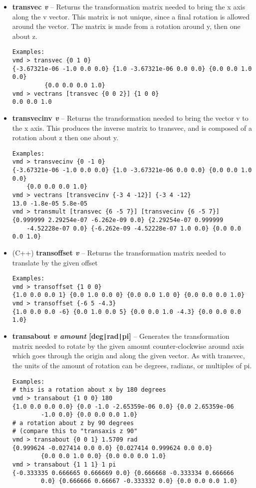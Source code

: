 \begin{itemize}
\item {\bf transvec {\it v}} --
Returns the transformation matrix needed to bring the x axis along the
v vector.  This matrix is not unique, since a final rotation is
allowed around the vector.  The matrix is made from a rotation around
y, then one about z.
\begin{verbatim}
Examples:
vmd > transvec {0 1 0}
{-3.67321e-06 -1.0 0.0 0.0} {1.0 -3.67321e-06 0.0 0.0} {0.0 0.0 1.0 0.0}
         {0.0 0.0 0.0 1.0}
vmd > vectrans [transvec {0 0 2}] {1 0 0}
0.0 0.0 1.0
\end{verbatim}

\item {\bf transvecinv {\it v}} --
Returns the transformation needed to bring the vector v to the x axis.
This produces the inverse matrix to transvec, and is composed of a
rotation about z then one about y.
\begin{verbatim}
Examples:
vmd > transvecinv {0 -1 0}
{-3.67321e-06 -1.0 0.0 0.0} {1.0 -3.67321e-06 0.0 0.0} {0.0 0.0 1.0 0.0}
    {0.0 0.0 0.0 1.0}
vmd > vectrans [transvecinv {-3 4 -12}] {-3 4 -12}
13.0 -1.8e-05 5.8e-05
vmd > transmult [transvec {6 -5 7}] [transvecinv {6 -5 7}]
{0.999999 2.29254e-07 -6.262e-09 0.0} {2.29254e-07 0.999999
    -4.52228e-07 0.0} {-6.262e-09 -4.52228e-07 1.0 0.0} {0.0 0.0 0.0 1.0}
\end{verbatim}

\item (C++) {\bf transoffset {\it v}} --
Returns the transformation matrix needed to translate by the given offset
\begin{verbatim}
Examples:
vmd > transoffset {1 0 0}
{1.0 0.0 0.0 1} {0.0 1.0 0.0 0} {0.0 0.0 1.0 0} {0.0 0.0 0.0 1.0}
vmd > transoffset {-6 5 -4.3}
{1.0 0.0 0.0 -6} {0.0 1.0 0.0 5} {0.0 0.0 1.0 -4.3} {0.0 0.0 0.0 1.0}
\end{verbatim}

\item {\bf transabout {\it v amount} [deg\verb!|!rad\verb!|!pi]} --
Generates the transformation matrix needed to rotate by the given amount
counter-clockwise around axis which goes through the origin and along the
given vector.  As with transvec, the units of the amount of rotation
can be degrees, radians, or multiples of pi.
\begin{verbatim}
Examples:
# this is a rotation about x by 180 degrees
vmd > transabout {1 0 0} 180
{1.0 0.0 0.0 0.0} {0.0 -1.0 -2.65359e-06 0.0} {0.0 2.65359e-06
        -1.0 0.0} {0.0 0.0 0.0 1.0}
# a rotation about z by 90 degrees
# (compare this to "transaxis z 90"
vmd > transabout {0 0 1} 1.5709 rad
{0.999624 -0.027414 0.0 0.0} {0.027414 0.999624 0.0 0.0} 
        {0.0 0.0 1.0 0.0} {0.0 0.0 0.0 1.0}
vmd > transabout {1 1 1} 1 pi
{-0.333335 0.666665 0.666669 0.0} {0.666668 -0.333334 0.666666
        0.0} {0.666666 0.66667 -0.333332 0.0} {0.0 0.0 0.0 1.0}
\end{verbatim}



\end{itemize}
